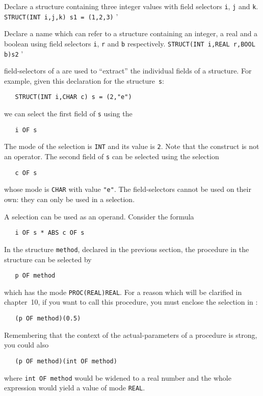 \begin{exercise}
\item Declare a structure containing three integer values with field
selectors \verb|i|, \verb|j| and \verb|k|.
\ans \verb|STRUCT(INT i,j,k) s1 = (1,2,3)|
'
\item Declare a name which can refer to a structure containing an
integer, a real and a boolean using field selectors \verb|i|,
\verb|r| and \verb|b| respectively.
\ans \verb|STRUCT(INT i,REAL r,BOOL b)s2|
'
\end{exercise}

 field-selectors of a
 are used to ``extract'' the
individual fields of a structure.  For example, given this
declaration for the structure~\verb|s|:
\begin{verbatim}
   STRUCT(INT i,CHAR c) s = (2,"e")
\end{verbatim}
\noindent
we can select the first field of \verb|s| using the 
\begin{verbatim}
   i OF s
\end{verbatim}
\noindent
The mode of the selection is \verb|INT| and its value is \verb|2|.
Note that the construct  is not an operator. The second
field of \verb|s| can be selected using the selection
\begin{verbatim}
   c OF s
\end{verbatim}
\noindent
whose mode is \verb|CHAR| with value \verb|"e"|. The field-selectors
cannot be used on their own: they can only be used in a selection.

A selection can be used as an operand. Consider the formula
\begin{verbatim}
   i OF s * ABS c OF s
\end{verbatim}
\noindent
In the structure \verb|method|, declared in the previous section, the
procedure in the structure can be selected by
\begin{verbatim}
   p OF method
\end{verbatim}
\noindent
which has the mode \verb|PROC(REAL)REAL|. For a reason which will be
clarified in chapter~10, if you want to call this procedure, you must
enclose the selection in :
\begin{verbatim}
   (p OF method)(0.5)
\end{verbatim}
\noindent
Remembering that the context of the actual-parameters of a procedure
is strong, you could also 
\begin{verbatim}
   (p OF method)(int OF method)
\end{verbatim}
\noindent
where \verb|int OF method| would be widened to a real number and the
whole expression would yield a value of mode \verb|REAL|.

